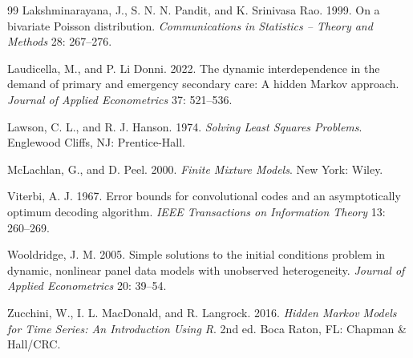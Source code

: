 \documentclass[11pt,a4paper]{article}
\begin{document}
\begin{thebibliography}{99}
Lakshminarayana, J., S. N. N. Pandit, and K. Srinivasa Rao. 1999. On a bivariate Poisson distribution.
\textit{Communications in Statistics -- Theory and Methods} 28: 267--276.

Laudicella, M., and P. Li Donni. 2022. The dynamic interdependence in the demand of primary and emergency
secondary care: A hidden Markov approach. \textit{Journal of Applied Econometrics} 37: 521--536.

Lawson, C. L., and R. J. Hanson. 1974. \textit{Solving Least Squares Problems}. Englewood Cliffs, NJ:
Prentice-Hall.

McLachlan, G., and D. Peel. 2000. \textit{Finite Mixture Models}. New York: Wiley.

Viterbi, A. J. 1967. Error bounds for convolutional codes and an asymptotically optimum decoding
algorithm. \textit{IEEE Transactions on Information Theory} 13: 260--269.

Wooldridge, J. M. 2005. Simple solutions to the initial conditions problem in dynamic, nonlinear panel
data models with unobserved heterogeneity. \textit{Journal of Applied Econometrics} 20: 39--54.

Zucchini, W., I. L. MacDonald, and R. Langrock. 2016. \textit{Hidden Markov Models for Time Series: An
Introduction Using R}. 2nd ed. Boca Raton, FL: Chapman \& Hall/CRC.
\end{thebibliography}
\end{document}
